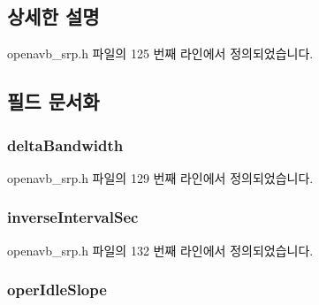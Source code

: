\subsection{상세한 설명}


openavb\+\_\+srp.\+h 파일의 125 번째 라인에서 정의되었습니다.



\subsection{필드 문서화}
\subsubsection[{\texorpdfstring{delta\+Bandwidth}{deltaBandwidth}}]{ delta\+Bandwidth}\hypertarget{struct_sr_class_parameters_a669359fff9505aab6aa9bed0088ffe4e}{}\label{struct_sr_class_parameters_a669359fff9505aab6aa9bed0088ffe4e}


openavb\+\_\+srp.\+h 파일의 129 번째 라인에서 정의되었습니다.

\subsubsection[{\texorpdfstring{inverse\+Interval\+Sec}{inverseIntervalSec}}]{ inverse\+Interval\+Sec}\hypertarget{struct_sr_class_parameters_adb05f48bdf4e3c85f1c408e5ab95de5f}{}\label{struct_sr_class_parameters_adb05f48bdf4e3c85f1c408e5ab95de5f}


openavb\+\_\+srp.\+h 파일의 132 번째 라인에서 정의되었습니다.

\subsubsection[{\texorpdfstring{oper\+Idle\+Slope}{operIdleSlope}}]{ oper\+Idle\+Slope}\hypertarget{struct_sr_class_parameters_a210b5d445110b98975edd37c37f2b805}{}\label{struct_sr_class_parameters_a210b5d445110b98975edd37c37f2b805}


